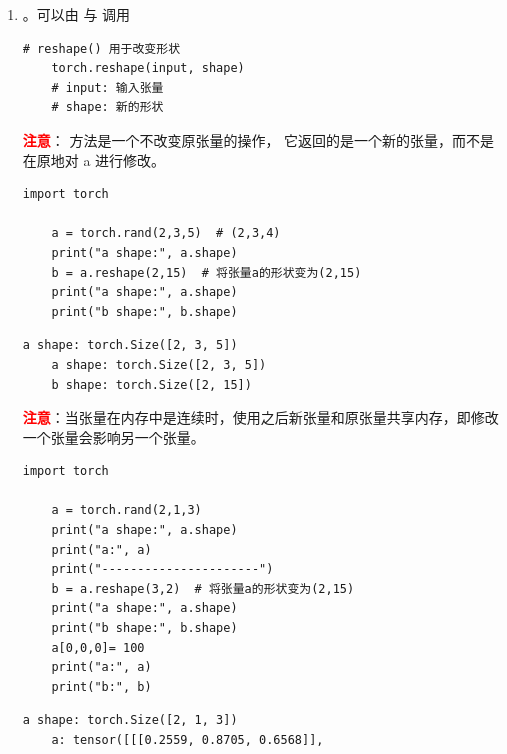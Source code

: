 \begin{enumerate}[label=\arabic*)]
\begin{lstlisting}[style=demostyle,numbers=none]
    After view(2, 15), a: tensor([[0.7896, 0.0760, 0.3403, 0.2851, 0.5863, 0.7447, 0.4550, 0.4071, 0.2395,
            0.2282, 0.8083, 0.2299, 0.2049, 0.7512, 0.1109],
            [0.8561, 0.9217, 0.1821, 0.8229, 0.8569, 0.3844, 0.5223, 0.9659, 0.3908,
            0.9212, 0.2532, 0.2833, 0.9911, 0.9758, 0.8310]])
    a.shape: torch.Size([2, 15])
    a.dim(): 2
    a.numel(): 30

    After view(-1), a: tensor([0.7896, 0.0760, 0.3403, 0.2851, 0.5863, 0.7447, 0.4550, 0.4071, 0.2395,
            0.2282, 0.8083, 0.2299, 0.2049, 0.7512, 0.1109, 0.8561, 0.9217, 0.1821,
            0.8229, 0.8569, 0.3844, 0.5223, 0.9659, 0.3908, 0.9212, 0.2532, 0.2833,
            0.9911, 0.9758, 0.8310])
    a.shape: torch.Size([30])
    a.dim(): 1
    a.numel(): 30
    \end{lstlisting}

    \item {}
    。可以由  与  调用

    \begin{lstlisting}[style=demostyle,numbers=none]
    # reshape() 用于改变形状
    torch.reshape(input, shape)
    # input: 输入张量
    # shape: 新的形状
    \end{lstlisting}

    \textcolor{red}{\textbf{注意}}： 方法是一个不改变原张量的操作，
    它返回的是一个新的张量，而不是在原地对 a 进行修改。

    \begin{lstlisting}[style=pythonstyle]
    import torch

    a = torch.rand(2,3,5)  # (2,3,4)
    print("a shape:", a.shape)
    b = a.reshape(2,15)  # 将张量a的形状变为(2,15)
    print("a shape:", a.shape)
    print("b shape:", b.shape)
    \end{lstlisting}
    \begin{lstlisting}[style=demostyle,numbers=none]
    a shape: torch.Size([2, 3, 5])
    a shape: torch.Size([2, 3, 5])
    b shape: torch.Size([2, 15])
    \end{lstlisting}

    \textcolor{red}{\textbf{注意}}：当张量在内存中是连续时，使用之后新张量和原张量共享内存，即修改一个张量会影响另一个张量。
    \begin{lstlisting}[style=pythonstyle]
    import torch

    a = torch.rand(2,1,3)  
    print("a shape:", a.shape)
    print("a:", a)
    print("----------------------")
    b = a.reshape(3,2)  # 将张量a的形状变为(2,15)
    print("a shape:", a.shape)
    print("b shape:", b.shape)
    a[0,0,0]= 100
    print("a:", a)
    print("b:", b)
    \end{lstlisting}
    \begin{lstlisting}[style=demostyle,numbers=none]
    a shape: torch.Size([2, 1, 3])
    a: tensor([[[0.2559, 0.8705, 0.6568]],
    

\end{lstlisting}
\end{enumerate}
